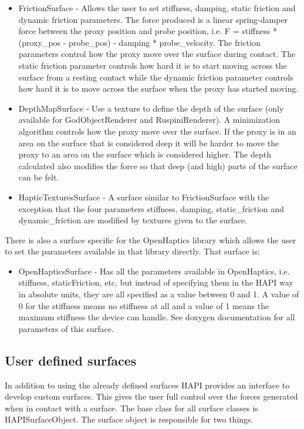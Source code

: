 \begin{itemize}
\item FrictionSurface - Allows the user to set stiffness, damping, static friction and dynamic friction parameters. The force produced is a linear spring-damper force between the proxy position and probe position, i.e. F = stiffness * (proxy\_pos - probe\_pos) - damping * probe\_velocity. The friction parameters control how the proxy move over the surface during contact. The static friction parameter controls how hard it is to start moving across the surface from a resting contact while the dynamic friction parameter controls how hard it is to move across the surface when the proxy has started moving.
\item DepthMapSurface - Use a texture to define the depth of the surface (only available for GodObjectRenderer and RuspiniRenderer). A minimization algorithm controls how the proxy move over the surface. If the proxy is in an area on the surface that is considered deep it will be harder to move the proxy to an area on the surface which is considered higher. The depth calculated also modifies the force so that deep (and high) parts of the surface can be felt.
\item HapticTexturesSurface - A surface similar to FrictionSurface with the exception that the four parameters stiffness, damping, static\_friction and dynamic\_friction are modified by textures given to the surface.
\end{itemize}

There is also a surface specific for the OpenHaptics
library which allows the user to set the parameters available in
that library directly. That surface is:
\begin{itemize}
\item OpenHapticsSurface - Has all the parameters available in
  OpenHaptics, i.e. stiffness, staticFriction, etc, but instead of
  specifying them in the HAPI way in absolute units, they are all
  specified as a value between 0 and 1. A value of 0 for the stiffness
  means no stiffness at all and a value of 1 means the maximum
  stiffness the device can handle. See doxygen documentation for all
  parameters of this surface.
\end{itemize}

\subsection{User defined surfaces}
In addition to using the already defined surfaces HAPI provides an interface to develop custom surfaces.
This gives the user full control over the forces generated when in contact with a surface.
The base class for all surface classes is HAPISurfaceObject. The surface object is responsible for two things. 


